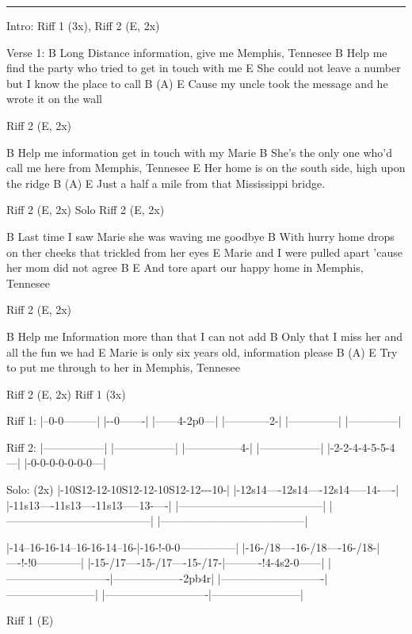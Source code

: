 \noindent\rule{\columnwidth}{1pt}

\begin{lstsong}
Intro: Riff 1 (3x), Riff 2 (E, 2x)

Verse 1:
B 
Long Distance information, give me Memphis, Tennesee
B 
Help me find the party who tried to get in touch with me
E 
She could not leave a number but I know the place to call
B                        (A)                           E 
Cause my uncle took the message and he wrote it on the wall

Riff 2 (E, 2x)

B 
Help me information get in touch with my Marie
B 
She's the only one who'd call me here from Memphis, Tennesee
E 
Her home is on the south side, high upon the ridge
B              (A)                       E 
Just a half a mile from that Mississippi bridge.

Riff 2 (E, 2x)
Solo
Riff 2 (E, 2x)

B 
Last time I saw Marie she was waving me goodbye
B 
With hurry home drops on ther cheeks that trickled from her eyes
E 
Marie and I were pulled apart 'cause her mom did not agree
B                                         E 
And tore apart our happy home in Memphis, Tennesee

Riff 2 (E, 2x)

B 
Help me Information more than that I can not add
B 
Only that I miss her and all the fun we had
E 
Marie is only six years old, information please
B                (A)                      E 
Try to put me through to her in Memphis, Tennesee

Riff 2 (E, 2x)
Riff 1 (3x)
\end{lstsong}
\begin{lsttab}
Riff 1:
|--0-0---------|
|--0-------|
|------4-2p0---|
|------------2-|
|--------------|
|--------------|

Riff 2:
|-----------------|
|-----------------|
|---------------4-|
|-----------------|
|-2-2-4-4-5-5-4---|
|-0-0-0-0-0-0-0---|

Solo:
(2x)
|-10S12-12-10S12-12-10S12-12---10-|
|-12s14----12s14----12s14-----14-----|
|-11s13----11s13----11s13-----13-----|
|---------------------------------------|
|---------------------------------------|
|---------------------------------------|

|-14--16-16-14--16-16-14--16-|-16-!-0-0---------------|
|-16-/18----16-/18----16-/18-|----!-!0------------|
|-15-/17----15-/17----15-/17-|----------!4-4s2-0------|
|----------------------------|-------------------2pb4r|
|----------------------------|------------------------|
|----------------------------|------------------------|

Riff 1 (E)
\end{lsttab}
\newpage



